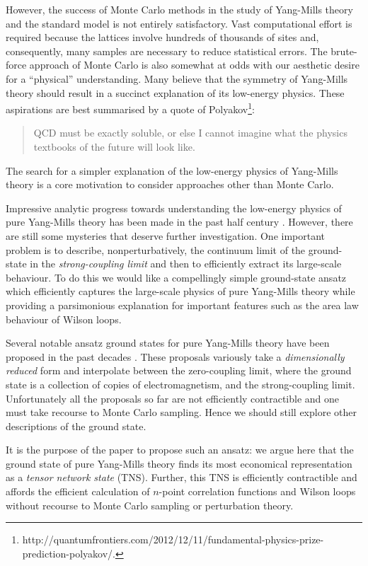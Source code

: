 \documentclass[twocolumn,lengthcheck,superscriptaddress]{revtex4-1}
\theoremstyle{definition}
\theoremstyle{remark}
\begin{document}
However, the success of Monte Carlo methods in the study of Yang-Mills theory and the standard model is not entirely satisfactory. Vast computational effort is required because the lattices  involve hundreds of thousands of sites and, consequently, many samples are necessary to reduce statistical errors. The brute-force approach of Monte Carlo is also somewhat at odds with our aesthetic desire for a ``physical'' understanding. Many believe that the  symmetry of Yang-Mills theory should result in a succinct explanation of its low-energy physics. These aspirations are best summarised by a quote of Polyakov\footnote{http://quantumfrontiers.com/2012/12/11/fundamental-physics-prize-prediction-polyakov/.}: \begin{quote} QCD must be exactly soluble, or else I cannot imagine what the physics textbooks of the future will look like. \end{quote} The search for a simpler explanation of the low-energy physics of Yang-Mills theory is a core motivation to consider approaches other than Monte Carlo.

Impressive analytic progress towards understanding the low-energy physics of pure Yang-Mills theory has been made in the past half century \cite{thooft:2005}. However, there are still some mysteries that deserve further investigation. One important problem is to describe, nonperturbatively, the continuum limit of the ground-state in the \emph{strong-coupling limit} and then to efficiently extract its large-scale behaviour. To do this we would like a compellingly simple ground-state ansatz which efficiently captures the large-scale physics of pure Yang-Mills theory while providing a parsimonious explanation for important features such as the area law behaviour of Wilson loops. 

Several notable ansatz ground states for pure Yang-Mills theory have been proposed in the past decades \cite{greensite:1979a, feynman:1981a, karabali:1998a, samuel:19967a}. These proposals variously take a \emph{dimensionally reduced} form and interpolate between the zero-coupling limit, where the ground state is a collection of copies of  electromagnetism, and the strong-coupling limit. Unfortunately all the proposals so far are not efficiently contractible and one must take recourse to Monte Carlo sampling. Hence we should still explore other descriptions of the ground state.

It is the purpose of the paper to propose such an ansatz: we argue here that the ground state of pure Yang-Mills theory finds its most economical representation as a \emph{tensor network state} (TNS). Further, this TNS is efficiently contractible and affords the efficient calculation of $n$-point correlation functions and Wilson loops without recourse to Monte Carlo sampling or perturbation theory.
\end{document}
